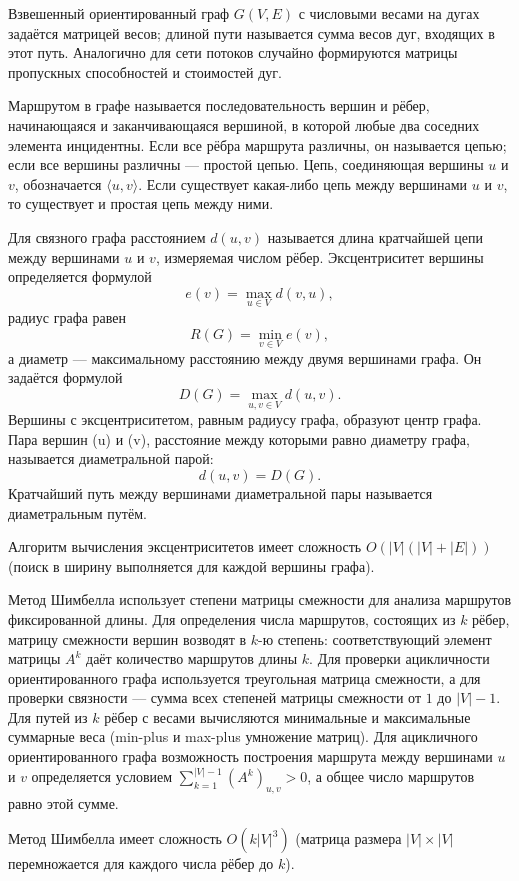 \documentclass[14pt,a4paper]{extarticle}
\begin{document}
Взвешенный ориентированный граф \(G(V,E)\) с числовыми весами на дугах задаётся матрицей весов; длиной пути называется сумма весов дуг, входящих в этот путь. Аналогично для сети потоков случайно формируются матрицы пропускных способностей и стоимостей дуг.

Маршрутом в графе называется последовательность вершин и рёбер, начинающаяся и заканчивающаяся вершиной, в которой любые два соседних элемента инцидентны. Если все рёбра маршрута различны, он называется цепью; если все вершины различны --- простой цепью. Цепь, соединяющая вершины \(u\) и \(v\), обозначается \(\langle u,v\rangle\). Если существует какая-либо цепь между вершинами \(u\) и \(v\), то существует и простая цепь между ними.

Для связного графа расстоянием \(d(u,v)\) называется длина кратчайшей цепи между вершинами \(u\) и \(v\), измеряемая числом рёбер. Эксцентриситет вершины определяется формулой
\[
e(v)=\max_{u \in V} d(v,u),
\]
радиус графа равен
\[
R(G)=\min_{v \in V} e(v),
\]
а диаметр --- максимальному расстоянию между двумя вершинами графа. Он задаётся формулой
\[
D(G)=\max_{u, v \in V} d(u, v).
\]
Вершины с эксцентриситетом, равным радиусу графа, образуют центр графа. Пара вершин (u) и (v), расстояние между которыми равно диаметру графа, называется диаметральной парой:
\[
d(u, v) = D(G).
\]
Кратчайший путь между вершинами диаметральной пары называется диаметральным путём.


Алгоритм вычисления эксцентриситетов имеет сложность \(O(|V|(|V|+|E|))\) (поиск в ширину выполняется для каждой вершины графа).

Метод Шимбелла использует степени матрицы смежности для анализа маршрутов фиксированной длины. Для определения числа маршрутов, состоящих из \(k\) рёбер, матрицу смежности вершин возводят в \(k\)-ю степень: соответствующий элемент матрицы \(A^k\) даёт количество маршрутов длины \(k\). Для проверки ацикличности ориентированного графа используется треугольная матрица смежности, а для проверки связности --- сумма всех степеней матрицы смежности от \(1\) до \(|V|-1\). Для путей из \(k\) рёбер с весами вычисляются минимальные и максимальные суммарные веса (min-plus и max-plus умножение матриц). Для ацикличного ориентированного графа возможность построения маршрута между вершинами \(u\) и \(v\) определяется условием \(\sum_{k=1}^{|V|-1}(A^k)_{u,v} > 0\), а общее число маршрутов равно этой сумме.

Метод Шимбелла имеет сложность \(O(k|V|^3)\) (матрица размера \(|V|\times|V|\) перемножается для каждого числа рёбер до \(k\)).
\end{document}
